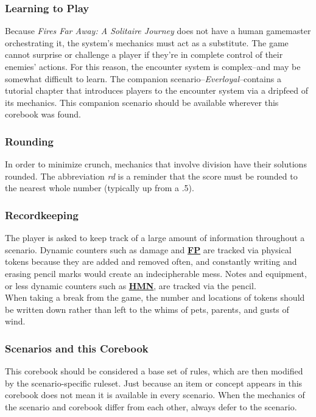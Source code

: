 \documentclass[12pt]{article}
\newcommand{\refto}[1]{\hyperlink{#1}{\textbf{#1}}}
\begin{document}
\begin{multicols*}{2}
\subsubsection*{Learning to Play}
Because \emph{Fires Far Away: A Solitaire Journey} does not have a human gamemaster orchestrating it, the system’s mechanics must act as a substitute. The game cannot surprise or challenge a player if they’re in complete control of their enemies’ actions. For this reason, the encounter system is complex--and may be somewhat difficult to learn. The companion scenario--\emph{Everloyal}--contains a tutorial chapter that introduces players to the encounter system via a dripfeed of its mechanics. This companion scenario should be available wherever this corebook was found.

\subsubsection*{Rounding}
In order to minimize crunch, mechanics that involve division have their solutions rounded. The abbreviation \emph{rd} is a reminder that the score must be rounded to the nearest whole number (typically up from a .5).

\subsubsection*{Recordkeeping}
The player is asked to keep track of a large amount of information throughout a scenario. Dynamic counters such as damage and \refto{FP} are tracked via physical tokens because they are added and removed often, and constantly writing and erasing pencil marks would create an indecipherable mess. Notes and equipment, or less dynamic counters such as \refto{HMN}, are tracked via the pencil.\\
When taking a break from the game, the number and locations of tokens should be written down rather than left to the whims of pets, parents, and gusts of wind.

\subsubsection*{Scenarios and this Corebook}
This corebook should be considered a base set of rules, which are then modified by the scenario-specific ruleset. Just because an item or concept appears in this corebook does not mean it is available in every scenario. When the mechanics of the scenario and corebook differ from each other, always defer to the scenario.


\end{multicols*}
\end{document}
